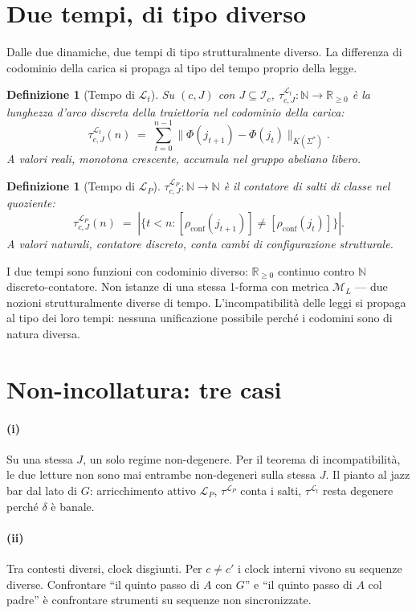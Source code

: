 \documentclass[
    oneside,                 %
    openany,                 %
    titlepage,
    11pt,
    a4paper,
    italian,
    DIV=14,                  %
    headinclude,
    footinclude=true,
    cleardoublepage=empty
]{scrbook}
\theoremstyle{ctplain}
\theoremstyle{ctdef}
\newtheorem{defn}[principio]{Definizione}
\theoremstyle{ctrem}
\newcommand{\Lt}{\mathcal{L}_t}
\newcommand{\LP}{\mathcal{L}_P}
\newcommand{\Phii}{\Phi}
\newcommand{\KSigma}{K(\Sigma^{*})}
\begin{document}
\section*{Due tempi, di tipo diverso}

Dalle due dinamiche, due tempi di tipo strutturalmente diverso. La differenza di codominio della carica si propaga al tipo del tempo proprio della legge.

\begin{defn}[Tempo di $\Lt$]
Su $(c, J)$ con $J \subseteq \mathcal{I}_c$, $\tau^{\Lt}_{c,J} : \mathbb{N} \to \mathbb{R}_{\geq 0}$ è la lunghezza d'arco discreta della traiettoria nel codominio della carica:
\[
\tau^{\Lt}_{c,J}(n) \;=\; \sum_{t=0}^{n-1} \|\Phii(j_{t+1}) - \Phii(j_t)\|_{\KSigma}.
\]
A valori reali, monotona crescente, accumula nel gruppo abeliano libero.
\end{defn}

\begin{defn}[Tempo di $\LP$]
$\tau^{\LP}_{c,J} : \mathbb{N} \to \mathbb{N}$ è il contatore di salti di classe nel quoziente:
\[
\tau^{\LP}_{c,J}(n) \;=\; |\{t < n : [\rho_{\mathrm{conf}}(j_{t+1})] \neq [\rho_{\mathrm{conf}}(j_t)]\}|.
\]
A valori naturali, contatore discreto, conta cambi di configurazione strutturale.
\end{defn}

I due tempi sono funzioni con codominio diverso: $\mathbb{R}_{\geq 0}$ continuo contro $\mathbb{N}$ discreto-contatore. Non istanze di una stessa 1-forma con metrica $\mathcal{M}_L$ --- due nozioni strutturalmente diverse di tempo. L'incompatibilità delle leggi si propaga al tipo dei loro tempi: nessuna unificazione possibile perché i codomini sono di natura diversa.

\section*{Non-incollatura: tre casi}

\paragraph{(i)} Su una stessa $J$, un solo regime non-degenere. Per il teorema di incompatibilità, le due letture non sono mai entrambe non-degeneri sulla stessa $J$. Il pianto al jazz bar dal lato di $G$: arricchimento attivo $\LP$, $\tau^{\LP}$ conta i salti, $\tau^{\Lt}$ resta degenere perché $\delta$ è banale.

\paragraph{(ii)} Tra contesti diversi, clock disgiunti. Per $c \neq c'$ i clock interni vivono su sequenze diverse. Confrontare ``il quinto passo di $A$ con $G$'' e ``il quinto passo di $A$ col padre'' è confrontare strumenti su sequenze non sincronizzate.
\end{document}
